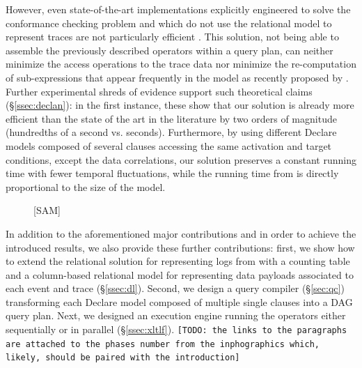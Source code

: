 However, even state-of-the-art implementations explicitly engineered to solve the conformance checking problem and which do not use the relational model to represent traces are not particularly efficient \cite{BurattinMS16}. This solution, not being able to assemble the previously described \LTLf operators within a query plan, can neither minimize the access operations to the trace data nor  minimize the re-computation of sub-expressions that appear frequently in the model as recently proposed by \cite{BellatrecheKB21}. Further experimental shreds of evidence support such theoretical claims (\S\ref{ssec:declan}): in the first instance, these show that our solution is already more efficient than the state of the art in the literature by two orders of magnitude (hundredths of a second vs. seconds). Furthermore, by using different Declare models composed of several clauses accessing the same activation and target conditions, except the data correlations, our solution preserves a constant running time with fewer temporal fluctuations, while the running time from  \cite{BurattinMS16} is directly proportional to the size of the model.

\begin{figure}
	\caption{[SAM]}\label{fig:pipe}
\end{figure}
In addition to the aforementioned major contributions and in order to achieve the introduced results, we also provide these further contributions: first, we show how to extend the relational solution for representing logs from \cite{Schonig15,SchonigRCJM16} with a counting table and a column-based relational model for representing data payloads associated to each event and trace (\S\ref{ssec:dl}). Second, we design a query compiler (\S\ref{sec:qc}) transforming each Declare model composed of multiple single clauses into a DAG query plan\cite{BellatrecheKB21}. Next, we designed an execution engine running the \xLTLf operators either sequentially or in parallel (\S\ref{ssec:xltlf}). \texttt{\color{red}[TODO: the links to the paragraphs are attached to the phases number from the inphographics which, likely, should be paired with the introduction]}
